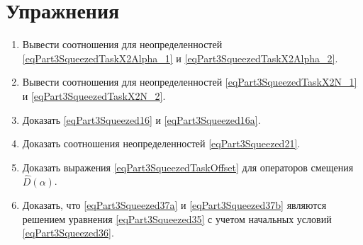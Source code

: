 \section{Упражнения}
\begin{enumerate}
\item Вывести соотношения для неопределенностей
  \eqref{eqPart3SqueezedTaskX2Alpha_1} и
  \eqref{eqPart3SqueezedTaskX2Alpha_2}.
\item Вывести соотношения для неопределенностей
  \eqref{eqPart3SqueezedTaskX2N_1} и
  \eqref{eqPart3SqueezedTaskX2N_2}.
\item Доказать \eqref{eqPart3Squeezed16} и
  \eqref{eqPart3Squeezed16a}. 
\item Доказать соотношения неопределенностей
  \eqref{eqPart3Squeezed21}. 
\item Доказать выражения \eqref{eqPart3SqueezedTaskOffset} для
  операторов смещения $\hat{D}\left(\alpha\right)$.
\item Доказать, что \eqref{eqPart3Squeezed37a} и
  \eqref{eqPart3Squeezed37b} являются решением 
  уравнения \eqref{eqPart3Squeezed35} с учетом начальных
  условий \eqref{eqPart3Squeezed36}.
\end{enumerate}
